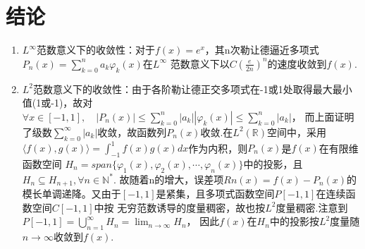 \documentclass{article}
\begin{document}
    \section{结论}
    \begin{enumerate}
        \item $L^{\infty}$范数意义下的收敛性：对于$f(x)=e^x$，其n次勒让德逼近多项式$P_n(x)=\sum_{k=0}^{n} a_k\varphi_k(x)$在$L^{\infty}$
        范数意义下以$C(\frac{e}{2n})^n$的速度收敛到$f(x)$.\\
        \item $L^2$范数意义下的收敛性：由于各阶勒让德正交多项式在-1或1处取得最大最小值(1或-1)，故对$\forall x\in [-1,1],\quad 
        |P_n(x)|\leqslant \sum_{k=0}^{n}|a_k||\varphi_k(x)| \leqslant \sum_{k=0}^{n}|a_k|$， 
        而上面证明了级数$\sum_{k=0}^{\infty}|a_k|$收敛，故函数列${P_n(x)}$收敛.在$L^2(\mathbb{R})$空间中，采用
        $\langle f(x),g(x) \rangle = \int_{-1}^{1}f(x)g(x)dx$作为内积，则$P_n(x)$是$f(x)$在有限维函数空间
        $H_n=span\{\varphi_1(x),\varphi_2(x),\cdots,\varphi_n(x)\}$中的投影，且$H_n\subseteq H_{n+1}, \forall n\in \mathbb{N^*}$.
        故随着n的增大，误差项$Rn(x)=f(x)-P_n(x)$的模长单调递降。又由于$[-1,1]$是紧集，且多项式函数空间$P[-1,1]$在连续函数空间$C[-1,1]$中按
        无穷范数诱导的度量稠密，故也按$L^2$度量稠密.注意到$P[-1,1]=\mathop{\bigcup}\limits_{n=1}^{\infty}H_n=\lim_{n \to \infty} H_n $，
        因此$f(x)$在$H_n$中的投影按$L^2$度量随$n \to \infty$收敛到$f(x)$.
    \end{enumerate}   
\end{document}
